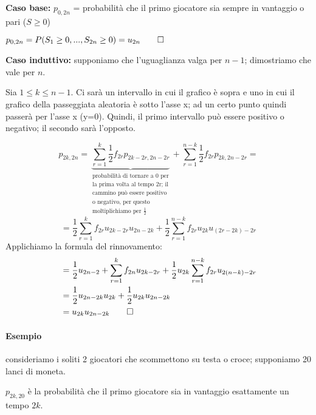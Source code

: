 \documentclass[a4paper,12pt]{book}
\begin{document}
\textbf{Caso base: } $ p_{0,2n} $ = probabilità che il primo giocatore sia sempre in vantaggio o pari ($ S \ge 0 $)

$ p_{0, 2n } = P(S_1 \ge 0, ..., S_{2n} \ge 0) = u_{2n} \qed$

\textbf{Caso induttivo: } supponiamo che l'uguaglianza valga per $ n-1 $; dimostriamo che vale per $ n $. 

Sia $ 1 \le k \le n-1 $. Ci sarà un intervallo in cui il grafico è sopra e uno in cui il grafico della passeggiata aleatoria è sotto l'asse x; ad un certo punto quindi passerà per l'asse x (y=0). Quindi, il primo intervallo può essere positivo o negativo; il secondo sarà l'opposto. 

$$ p_{2k, 2n} = \underbrace{\sum_{r=1}^{k}\frac{1}{2} f_{2r} p_{2k-2r, 2n-2r}}_{\substack{\text{probabilità di tornare a 0 per} \\ \text{la prima volta al tempo 2r; il} \\ \text{cammino può essere positivo} \\ \text{o negativo, per questo} \\ \text{moltiplichiamo per } \frac{1}{2}}}       + \sum_{r=1}^{n-k} \frac{1}{2}f_{2r}p_{2k, 2n-2r} =  $$ 
$$ = \frac{1}{2} \sum_{r=1}^{k} f_{2r}u_{2k-2r}u_{2n-2k} + \frac{1}{2}\sum_{r=1}^{n-k}f_{2r}u_{2k}u_{(2r-2k) - 2r}$$
Applichiamo la formula del rinnovamento:
\begin{align*}
	& = \frac{1}{2}u_{2n-2} + \sum_{r=1}^{k}f_{2n}u_{2k-2r} + \frac{1}{2}u_{2k}\sum_{r=1}^{n-k}f_{2r} u_{2(n-k) - 2r} \\
	& = \frac{1}{2} u_{2n-2k}u_{2k} + \frac{1}{2}u_{2k}u_{2n-2k} \\
	& = u_{2k}u_{2n-2k} \qed 
\end{align*}

\paragraph{Esempio} consideriamo i soliti 2 giocatori che scommettono su testa o croce; supponiamo 20 lanci di moneta. 

$ p_{2k,20} $ è la probabilità che il primo giocatore sia in vantaggio esattamente un tempo $ 2k $.
\end{document}
